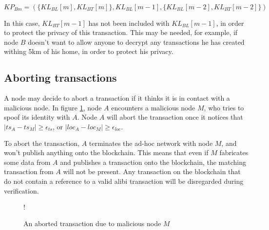 ${KP_{Bm} = (\{KL_{BL}[m], KL_{BT}[m]\}, KL_{BL}[m-1], \{KL_{BL}[m-2], KL_{BT}[m-2]\})}$

\null
In this case, $KL_{BT}[m-1]$ has not been included with $KL_{BL}[m-1]$, in order to protect the privacy of this transaction. This may be needed, for example, if node $B$ doesn't want to allow anyone to decrypt any transactions he has created withing 5km of his home, in order to protect his privacy.

\subsection{Aborting transactions}
A node may decide to abort a transaction if it thinks it is in contact with a malicious node. In figure \ref{fig:aborted_transaction}, node $A$ encounters a malicious node $M$, who tries to spoof its identity with $A$. Node $A$ will abort the transaction once it notices that $|ts_A-ts_M| \geq \epsilon_{ts}$, or $|loc_A-loc_M| \geq \epsilon_{loc}$.

To abort the transaction, $A$ terminates the ad-hoc network with node $M$, and won't publish anything onto the blockchain. This means that even if $M$ fabricates some data from $A$ and publishes a transaction onto the blockchain, the matching transaction from $A$ will not be present. Any transaction on the blockchain that do not contain a reference to a valid  alibi transaction will be disregarded during verification.

\begin{figure}[h]
\resizebox {\columnwidth} {!} {}
\caption{An aborted transaction due to malicious node $M$}
\label{fig:aborted_transaction}
\end{figure}

